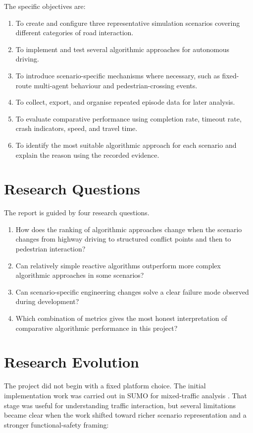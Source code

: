 \documentclass[12pt,a4paper]{report}
\begin{document}
\vspace{0.5em}
The specific objectives are:
\begin{enumerate}[label=\arabic*.]
    \item To create and configure three representative simulation scenarios covering different categories of road interaction.
    \item To implement and test several algorithmic approaches for autonomous driving.
    \item To introduce scenario-specific mechanisms where necessary, such as fixed-route multi-agent behaviour and pedestrian-crossing events.
    \item To collect, export, and organise repeated episode data for later analysis.
    \item To evaluate comparative performance using completion rate, timeout rate, crash indicators, speed, and travel time.
    \item To identify the most suitable algorithmic approach for each scenario and explain the reason using the recorded evidence.
\end{enumerate}

\section{Research Questions}
The report is guided by four research questions.

\begin{enumerate}[label=\textbf{RQ\arabic*.}]
    \item How does the ranking of algorithmic approaches change when the scenario changes from highway driving to structured conflict points and then to pedestrian interaction?
    \item Can relatively simple reactive algorithms outperform more complex algorithmic approaches in some scenarios?
    \item Can scenario-specific engineering changes solve a clear failure mode observed during development?
    \item Which combination of metrics gives the most honest interpretation of comparative algorithmic performance in this project?
\end{enumerate}

\section{Research Evolution}
The project did not begin with a fixed platform choice. The initial implementation work was carried out in SUMO for mixed-traffic analysis \cite{sumo,sumo_docs}. That stage was useful for understanding traffic interaction, but several limitations became clear when the work shifted toward richer scenario representation and a stronger functional-safety framing:
\end{document}
